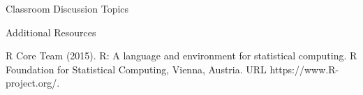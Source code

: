 \begin{frame}[t]
\begin{columns}[t]
\begin{column}{\onecolwid}
\begin{alertblock}{Classroom Discussion Topics}
\end{alertblock}
\begin{alertblock}{Additional Resources}
\begin{enumerate}
\end{enumerate}
\end{alertblock}

\begin{thebibliography}{00}
\footnotesize		 		
{}R Core Team (2015). 
\newblock R: A language and environment for statistical computing. R Foundation for Statistical Computing, Vienna, Austria.
\newblock URL https://www.R-project.org/.		
\end{thebibliography}
\end{column}
\end{columns}
\end{frame}

